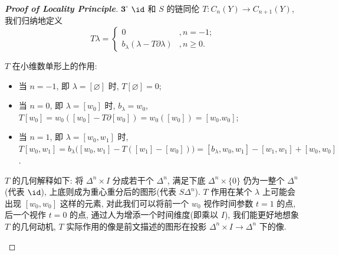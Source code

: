 \begin{proof}[{\bf Proof of Locality Principle}]
        \noindent$\mathbf{3}^{\circ}$ $\id$ 和 $S$ 的链同伦 $T:C_n(Y)\rightarrow C_{n+1}(Y)$, 我们归纳地定义
        \begin{equation*}
            T\lambda = 
            \begin{cases}
                0 &, n = -1; \\
                b_{\lambda}(\lambda-T\partial\lambda) &, n\geq0.
            \end{cases}
        \end{equation*}
        \begin{center}
        \end{center}
        $T$ 在小维数单形上的作用:
        \begin{itemize}
            \item  当 $n=-1$, 即 $\lambda=[\varnothing]$ 时, $T[\varnothing] = 0$; 
            \item 当 $n=0$, 即 $\lambda=[w_0]$ 时, $b_\lambda=w_0$, $T[w_0] = w_0([w_0]-T\partial[w_0]) = w_0([w_0]) = [w_0.w_0]$;
            \item  当 $n=1$, 即 $\lambda=[w_0,w_1]$ 时, $T[w_0,w_1] = b_{\lambda}\Big([w_0,w_1]-T([w_1]-[w_0])\Big) = [b_{\lambda},w_0,w_1]-[w_1,w_1]+[w_0,w_0]$.
        \end{itemize}
        $T$ 的几何解释如下: 将 $\Delta^n\times I$ 分成若干个 $\Delta^n$, 满足下底 $\Delta^n\times\{0\}$ 仍为一整个 $\Delta^n$(代表 $\id$), 
        上底则成为重心重分后的图形(代表 $S\Delta^n$). $T$ 作用在某个 $\lambda$ 上可能会出现 $[w_0,w_0]$ 这样的元素, 
        对此我们可以将前一个 $w_0$ 视作时间参数 $t=1$ 的点, 后一个视作 $t=0$ 的点, 通过人为增添一个时间维度(即乘以 $I$), 我们能更好地想象 $T$ 的几何动机, 
        $T$ 实际作用的像是前文描述的图形在投影 $\Delta^n\times I\rightarrow\Delta^n$ 下的像.
        \begin{figure}[hbtp]

\end{figure}
\end{proof}
